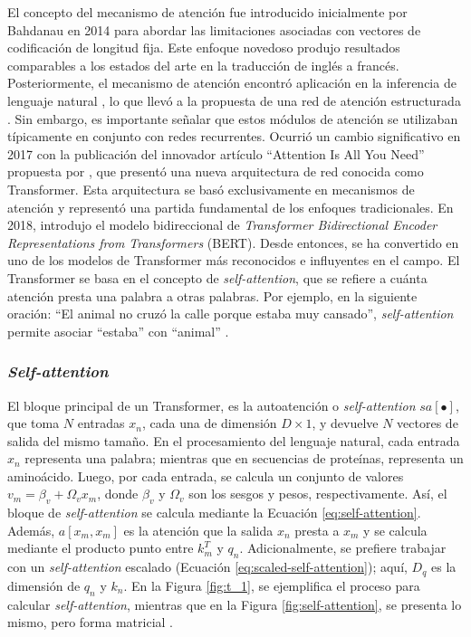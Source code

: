 El concepto del mecanismo de atención fue introducido inicialmente por Bahdanau en 2014 \citep{bahdanau2014neural} para abordar las limitaciones asociadas con vectores de codificación de longitud fija. Este enfoque novedoso produjo resultados comparables a los estados del arte en la traducción de inglés a francés. Posteriormente, el mecanismo de atención encontró aplicación en la inferencia de lenguaje natural \citep{parikh2016decomposable}, lo que llevó a la propuesta de una red de atención estructurada \citep{kim2017structured}. Sin embargo, es importante señalar que estos módulos de atención se utilizaban típicamente en conjunto con redes recurrentes. Ocurrió un cambio significativo en 2017 con la publicación del innovador artículo ``Attention Is All You Need'' propuesta por \cite{vaswani2017attention}, que presentó una nueva arquitectura de red conocida como Transformer. Esta arquitectura se basó exclusivamente en mecanismos de atención y representó una partida fundamental de los enfoques tradicionales. En 2018, \cite{devlin2018bert} introdujo el modelo bidireccional de \textit{Transformer Bidirectional Encoder Representations from Transformers} (BERT). Desde entonces, se ha convertido en uno de los modelos de Transformer más reconocidos e influyentes en el campo. El Transformer se basa en el concepto de \textit{self-attention}, que se refiere a cuánta atención presta una palabra a otras palabras. Por ejemplo, en la siguiente oración: ``El animal no cruzó la calle porque estaba muy cansado'', \textit{self-attention} permite asociar ``estaba'' con ``animal'' \citep{prince2023understanding}.

\subsubsection{\textit{Self-attention}}

El bloque principal de un Transformer, es la autoatención o \textit{self-attention} $sa[\bullet]$, que toma $N$ entradas $x_n$, cada una de dimensión $D \times 1$, y devuelve $N$ vectores de salida del mismo tamaño. En el procesamiento del lenguaje natural, cada entrada $x_n$ representa una palabra; mientras que en secuencias de proteínas, representa un aminoácido. Luego, por cada entrada, se calcula un conjunto de valores $v_m = \beta_v + \Omega_vx_m$, donde $\beta_v$ y $\Omega_v$ son los sesgos y pesos, respectivamente. Así, el bloque de \textit{self-attention} se calcula mediante la Ecuación \ref{eq:self-attention}. Además, $a[x_m, x_m]$ es la atención que la salida $x_n$ presta a $x_m$ y se calcula mediante el producto punto entre $k_m^T$ y $q_n$. Adicionalmente, se prefiere trabajar con un \textit{self-attention}  escalado (Ecuación \ref{eq:scaled-self-attention}); aquí, $D_q$ es la dimensión de $q_n$ y $k_n$. En la Figura \ref{fig:t_1}, se ejemplifica el proceso para calcular \textit{self-attention}, mientras que en la Figura \ref{fig:self-attention}, se presenta lo mismo, pero forma matricial \citep{prince2023understanding}.


